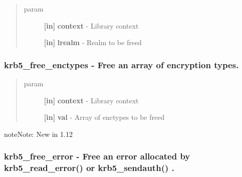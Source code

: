 \documentclass[letterpaper,10pt,english]{sphinxmanual}
\begin{document}
\begin{quote}\begin{description}
\item[{param}] \leavevmode
\textbf{{[}in{]}} \textbf{context} - Library context

\textbf{{[}in{]}} \textbf{lrealm} - Realm to be freed

\end{description}\end{quote}


\subsubsection{krb5\_free\_enctypes -  Free an array of encryption types.}
\label{appdev/refs/api/krb5_free_enctypes::doc}\label{appdev/refs/api/krb5_free_enctypes:krb5-free-enctypes-free-an-array-of-encryption-types}

\begin{fulllineitems}
\label{appdev/refs/api/krb5_free_enctypes:c.krb5_free_enctypes}
\end{fulllineitems}

\begin{quote}\begin{description}
\item[{param}] \leavevmode
\textbf{{[}in{]}} \textbf{context} - Library context

\textbf{{[}in{]}} \textbf{val} - Array of enctypes to be freed

\end{description}\end{quote}

\begin{notice}{note}{Note:}
New in 1.12
\end{notice}


\subsubsection{krb5\_free\_error -  Free an error allocated by krb5\_read\_error() or krb5\_sendauth() .}
\label{appdev/refs/api/krb5_free_error::doc}\label{appdev/refs/api/krb5_free_error:krb5-free-error-free-an-error-allocated-by-krb5-read-error-or-krb5-sendauth}
\end{document}
